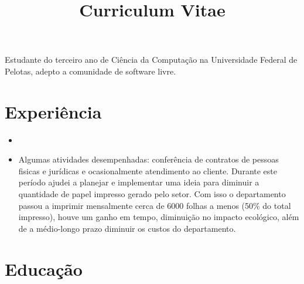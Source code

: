 \documentclass[11pt,a4paper,sans]{moderncv}        %
\title{Curriculum Vitae}                               %
\begin{document}
\makecvtitle

\small{Estudante do terceiro ano de Ciência da Computação na Universidade Federal de Pelotas, adepto a comunidade de software livre.}

\section{Experiência}

\vspace{6pt}

\begin{itemize}
\item{}

\vspace{6pt}

\item{
{\vspace{3pt}Algumas atividades desempenhadas: conferência de contratos de pessoas fisicas e jurídicas e ocasionalmente atendimento ao cliente. Durante este período ajudei a planejar e implementar uma ideia para diminuir a quantidade de papel impresso gerado pelo setor. Com isso o departamento passou a imprimir mensalmente cerca de 6000 folhas a menos (50\% do total impresso), houve um ganho em tempo, diminuição no impacto ecológico, além de a médio-longo prazo diminuir os custos do departamento.}}

\vspace{6pt}

\end{itemize}

\section{Educação}

\vspace{5pt}
\end{document}
